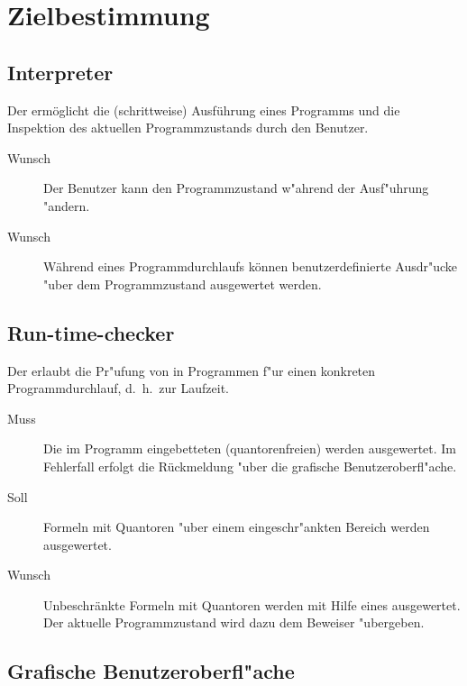 \section{Zielbestimmung}%


\subsection{Interpreter}%

Der  ermöglicht die (schrittweise) Ausführung eines Programms und die Inspektion des aktuellen Programmzustands durch den Benutzer.%

\begin{description}%
    \item[Wunsch] Der Benutzer kann den Programmzustand w"ahrend der Ausf"uhrung "andern.%
    \item[Wunsch] Während eines Programmdurchlaufs können benutzerdefinierte Ausdr"ucke "uber dem Programmzustand ausgewertet werden.%
\end{description}%

\subsection{Run-time-checker}%

Der  erlaubt die Pr"ufung von  in Programmen f"ur einen konkreten Programmdurchlauf, d.~h.\ zur Laufzeit.%

\begin{description}%
    \item [Muss] Die im Programm eingebetteten (quantorenfreien)  werden ausgewertet. Im Fehlerfall erfolgt die Rückmeldung "uber die grafische Benutzeroberfl"ache.
    \item [Soll] Formeln mit Quantoren "uber einem eingeschr"ankten Bereich werden ausgewertet.%
    \item [Wunsch] Unbeschränkte Formeln mit Quantoren werden mit Hilfe eines  ausgewertet. Der aktuelle Programmzustand wird dazu dem Beweiser "ubergeben.
\end{description}%

\subsection{Grafische Benutzeroberfl"ache}%

